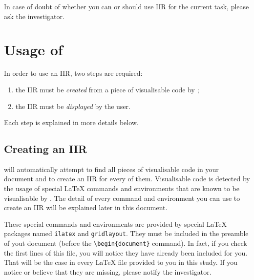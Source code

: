 \documentclass[11pt, a4paper]{article}
\begin{document}
In case of doubt of whether you can or should use IIR for the current task, please ask the investigator.



\section{Usage of \iLaTeX{}}
In order to use an IIR, two steps are required:
\begin{enumerate}[noitemsep]
    \item the IIR must be \emph{created} from a piece of visualisable code by \iLaTeX{};
    \item the IIR must be \emph{displayed} by the user.
\end{enumerate}

Each step is explained in more details below.

\subsection{Creating an IIR}
\iLaTeX{} will automatically attempt to find all pieces of visualisable code in your document and to create an IIR for every of them.
Visualisable code is detected by the usage of special \LaTeX{} commands and environments that are known to be visualisable by \iLaTeX{}.
The detail of every command and environment you can use to create an IIR will be explained later in this document.

These special commands and environments are provided by special \LaTeX{} packages named \texttt{ilatex} and \texttt{gridlayout}.
They must be included in the preamble of yout document (\ie before the \verb|\begin{document}| command).
In fact, if you check the first lines of this file, you will notice they have already been included for you. That will be the case in every \LaTeX{} file provided to you in this study.
If you notice or believe that they are missing, please notify the investigator.
\end{document}
